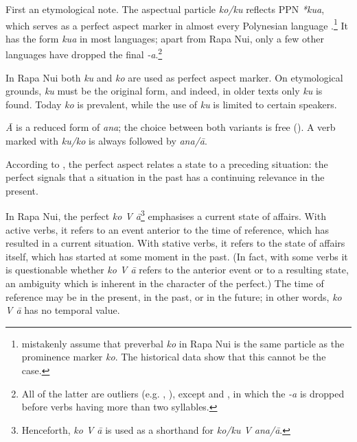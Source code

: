 First an etymological note. The aspectual particle \textit{ko/ku} reflects PPN \textit{*kua}, which serves as a perfect aspect marker in almost every Polynesian language \citep[30]{Clark1976}.\footnote{\label{fn:331}\citet[15]{MassamLee2006} mistakenly assume that preverbal \textit{ko} in Rapa Nui is the same particle as the prominence marker \textit{ko}. The historical data show that this cannot be the case.} It has the form \textit{kua} in most languages; apart from Rapa Nui, only a few other languages have dropped the final \textit{-a}.\footnote{\label{fn:332}All of the latter are outliers (e.g. , ), except  \citep[34]{Zewen1987} and  \citep[61]{Janeau1908}, in which the \textit{-a} is dropped before verbs having more than two syllables.} 

In Rapa Nui both \textit{ku} and \textit{ko} are used as perfect aspect marker. On etymological grounds, \textit{ku} must be the original form, and indeed, in older texts only \textit{ku} is found. Today \textit{ko} is prevalent, while the use of \textit{ku} is limited to certain speakers.

\textit{{\ꞌ}Ā} is a reduced form of \textit{{\ꞌ}ana}; the choice between both variants is free (). A verb marked with \textit{ku/ko} is always followed by \textit{{\ꞌ}ana/{\ꞌ}ā}. 

According to \citet{Comrie1976}, the perfect aspect relates a state to a preceding situation: the perfect signals that a situation in the past has a continuing relevance in the present.

In Rapa Nui, the perfect \textit{ko V {\ꞌ}ā}\footnote{\label{fn:333}Henceforth, \textit{ko V {\ꞌ}ā} is used as a shorthand for \textit{ko/ku V {\ꞌ}ana/{\ꞌ}ā}.} emphasises a current state of affairs. With active verbs, it refers to an event anterior to the time of reference, which has resulted in a current situation. With stative verbs, it refers to the state of affairs itself, which has started at some moment in the past. (In fact, with some verbs it is questionable whether \textit{ko V {\ꞌ}ā} refers to the anterior event or to a resulting state, an ambiguity which is inherent in the character of the perfect.) The time of reference may be in the present, in the past, or in the future; in other words, \textit{ko V {\ꞌ}ā} has no temporal value. 

